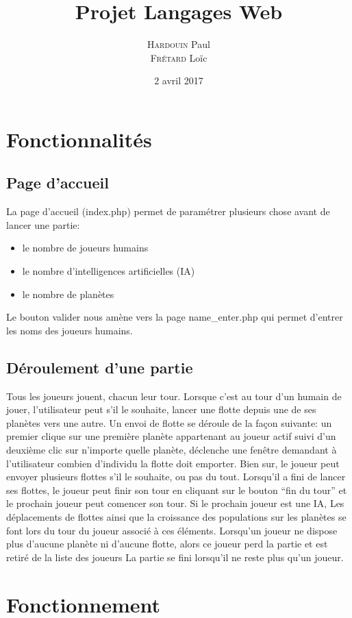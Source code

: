\documentclass[a4paper]{report}
\title{Projet Langages Web}
\author{\textsc{Hardouin} Paul\\\textsc{Frétard} Loïc}
\date{2 avril 2017}
\begin{document}
\maketitle
\chapter*{Fonctionnalités}
\section*{Page d'accueil}

La page d'accueil (index.php) permet de paramétrer plusieurs chose avant de lancer une partie:
\begin{itemize}
 \item le nombre de joueurs humains
 \item le nombre d'intelligences artificielles (IA)
 \item le nombre de planètes
\end{itemize}

Le bouton valider nous amène vers la page name\_enter.php qui permet d'entrer
les noms des joueurs humains.

\section*{Déroulement d'une partie}

Tous les joueurs jouent, chacun leur tour.
Lorsque c'est au tour d'un humain de jouer, l'utilisateur peut s'il le souhaite,
lancer une flotte depuis une de ses planètes vers une autre. Un envoi de flotte
se déroule de la façon suivante: un premier clique sur une première planète appartenant au
joueur actif suivi d'un deuxième clic sur n'importe quelle planète, déclenche une
fenêtre demandant à l'utilisateur combien d'individu la flotte doit emporter. Bien sur,
le joueur peut envoyer plusieurs flottes s'il le souhaite, ou pas du tout.
Lorsqu'il a fini de lancer ses flottes, le joueur peut finir son tour en cliquant sur le bouton
``fin du tour'' et le prochain joueur peut comencer son tour. Si le prochain joueur est une IA,
Les déplacements de flottes ainsi que la croissance des populations sur les
planètes se font lors du tour du joueur associé à ces éléments.
Lorsqu'un joueur ne dispose plus d'aucune planète ni d'aucune flotte,
alors ce joueur perd la partie et est retiré de la liste des joueurs
La partie se fini lorsqu'il ne reste plus qu'un joueur.

\chapter*{Fonctionnement}
\end{document}
